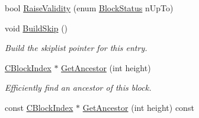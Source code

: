 \begin{DoxyCompactItemize}
bool \mbox{\hyperlink{class_c_block_index_a076aff906933e9d75a37aa9b81c01384}{Raise\+Validity}} (enum \mbox{\hyperlink{chain_8h_a0d8c285f70a59a32f4f6ab41b78f93ad}{Block\+Status}} n\+Up\+To)
\item 
void \mbox{\hyperlink{class_c_block_index_a21209a71e50daf10e283bd4049e46f64}{Build\+Skip}} ()
\begin{DoxyCompactList}\small\item\em Build the skiplist pointer for this entry. \end{DoxyCompactList}\item 
\mbox{\hyperlink{class_c_block_index}{C\+Block\+Index}} $\ast$ \mbox{\hyperlink{class_c_block_index_ae1f702384690c6b8302e026a84172ef3}{Get\+Ancestor}} (int height)
\begin{DoxyCompactList}\small\item\em Efficiently find an ancestor of this block. \end{DoxyCompactList}\item 
const \mbox{\hyperlink{class_c_block_index}{C\+Block\+Index}} $\ast$ \mbox{\hyperlink{class_c_block_index_a7a58b33d64fde3df36c6e61371d031cc}{Get\+Ancestor}} (int height) const
\end{DoxyCompactItemize}
